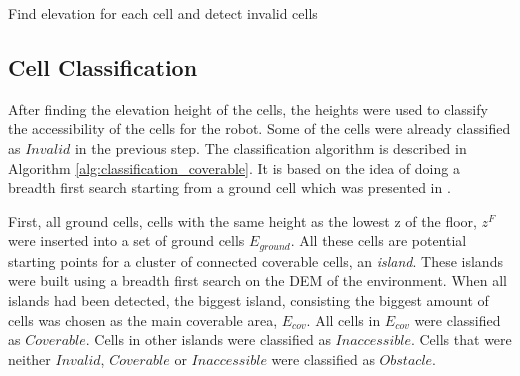 \begin{algorithm}[H]
\SetAlgoLined
{}
 \caption{Find elevation for each cell and detect invalid cells}
 \label{alg:elevation}
\end{algorithm}

\subsection{Cell Classification}
After finding the elevation height of the cells, the heights were used to classify the accessibility of the cells for the robot. Some of the cells were already classified as $Invalid$ in the previous step. The classification algorithm is described in Algorithm \ref{alg:classification_coverable}. It is based on the idea of doing a breadth first search starting from a ground cell which was presented in \cite{terrainassessment}. 

First, all ground cells, cells with the same height as the lowest z of the floor, $z^F$ were inserted into a set of ground cells $E_{ground}$. All these cells are potential starting points for a cluster of connected coverable cells, an \emph{island}. These islands were built using a breadth first search on the DEM of the environment. When all islands had been detected, the biggest island, consisting the biggest amount of cells was chosen as the main coverable area, $E_{cov}$. All cells in $E_{cov}$ were classified as $Coverable$. Cells in other islands were classified as $Inaccessible$. Cells that were neither $Invalid$, $Coverable$ or $Inaccessible$ were classified as $Obstacle$. 

